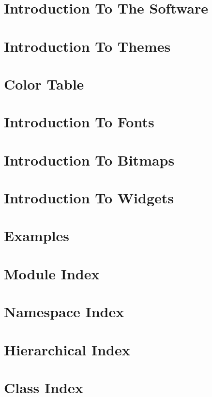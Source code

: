 \documentclass[twoside]{book}
\begin{document}
\chapter{Introduction To The Software}
\label{introSoftware}
\hypertarget{introSoftware}{}

\chapter{Introduction To Themes}
\label{introThemes}
\hypertarget{introThemes}{}

\chapter{Color Table}
\label{colors}
\hypertarget{colors}{}

\chapter{Introduction To Fonts}
\label{introFonts}
\hypertarget{introFonts}{}

\chapter{Introduction To Bitmaps}
\label{introBitmaps}
\hypertarget{introBitmaps}{}

\chapter{Introduction To Widgets}
\label{introWidgets}
\hypertarget{introWidgets}{}

\chapter{Examples}
\label{examples}
\hypertarget{examples}{}

\chapter{Module Index}

\chapter{Namespace Index}

\chapter{Hierarchical Index}

\chapter{Class Index}

\end{document}
